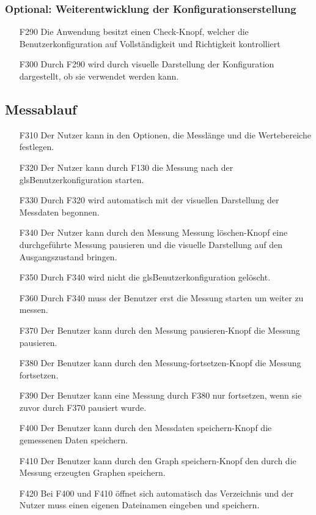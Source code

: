 \documentclass[parskip=full]{scrartcl}
\begin{document}
\subsubsection{Optional: Weiterentwicklung der Konfigurationserstellung}

\begin{itemize}

\item[F290] Die Anwendung besitzt einen Check-Knopf, welcher die \gls{Benutzerkonfiguration} auf Vollständigkeit und Richtigkeit
kontrolliert
\item[F300] Durch F290 wird durch visuelle Darstellung der Konfiguration dargestellt, ob sie verwendet werden kann.

\end{itemize}

\subsection{Messablauf}

\begin{itemize}

\item[F310] Der Nutzer kann in den Optionen, die Messlänge und die Wertebereiche festlegen.
\item[F320] Der Nutzer kann durch F130 die Messung nach der gls{Benutzerkonfiguration} starten.
\item[F330] Durch F320 wird automatisch mit der visuellen Darstellung der Messdaten begonnen.
\item[F340] Der Nutzer kann durch den Messung Messung löschen-Knopf eine durchgeführte Messung pausieren und die visuelle Darstellung auf den Ausgangszustand bringen.
\item[F350] Durch F340 wird nicht die gls{Benutzerkonfiguration} gelöscht.
\item[F360] Durch F340 muss der Benutzer erst die Messung starten um weiter zu messen.
\item[F370] Der Benutzer kann durch den Messung pausieren-Knopf die Messung pausieren.
\item[F380] Der Benutzer kann durch den Messung-fortsetzen-Knopf die Messung fortsetzen.
\item[F390] Der Benutzer kann eine Messung durch F380 nur fortsetzen, wenn sie zuvor durch F370 pausiert wurde.
\item[F400] Der Benutzer kann durch den Messdaten speichern-Knopf die gemessenen Daten speichern.
\item[F410] Der Benutzer kann durch den Graph speichern-Knopf den durch die Messung erzeugten Graphen speichern.
\item[F420] Bei F400 und F410 öffnet sich automatisch das Verzeichnis und der Nutzer muss einen eigenen Dateinamen eingeben und speichern. 



\end{itemize}
\end{document}
